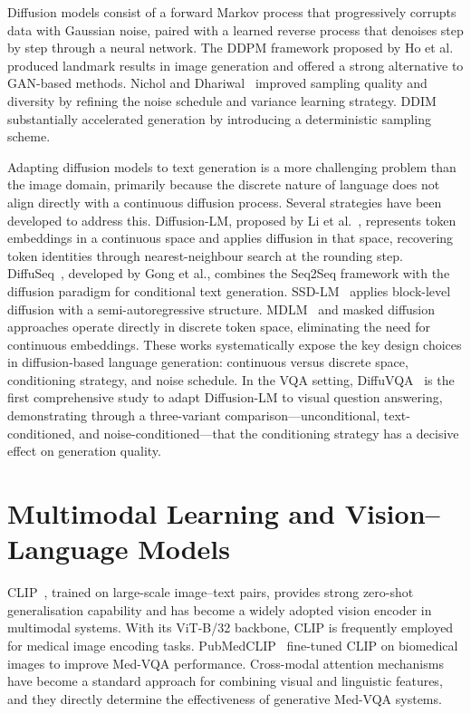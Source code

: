 \documentclass[9pt]{report}
\begin{document}
Diffusion models consist of a forward Markov process that progressively corrupts data with Gaussian noise, paired with a learned reverse process that denoises step by step through a neural network. The DDPM framework proposed by Ho et al.~\cite{ddpm} produced landmark results in image generation and offered a strong alternative to GAN-based methods. Nichol and Dhariwal~\cite{improved_ddpm} improved sampling quality and diversity by refining the noise schedule and variance learning strategy. DDIM~\cite{ddim} substantially accelerated generation by introducing a deterministic sampling scheme.

Adapting diffusion models to text generation is a more challenging problem than the image domain, primarily because the discrete nature of language does not align directly with a continuous diffusion process. Several strategies have been developed to address this. Diffusion-LM, proposed by Li et al.~\cite{diffusionlm}, represents token embeddings in a continuous space and applies diffusion in that space, recovering token identities through nearest-neighbour search at the rounding step. DiffuSeq~\cite{diffuseq}, developed by Gong et al., combines the Seq2Seq framework with the diffusion paradigm for conditional text generation. SSD-LM~\cite{ssdlm} applies block-level diffusion with a semi-autoregressive structure. MDLM~\cite{mdlm} and masked diffusion approaches operate directly in discrete token space, eliminating the need for continuous embeddings. These works systematically expose the key design choices in diffusion-based language generation: continuous versus discrete space, conditioning strategy, and noise schedule. In the VQA setting, DiffuVQA~\cite{diffuvqa} is the first comprehensive study to adapt Diffusion-LM to visual question answering, demonstrating through a three-variant comparison---unconditional, text-conditioned, and noise-conditioned---that the conditioning strategy has a decisive effect on generation quality.

\section{Multimodal Learning and Vision--Language Models}

CLIP~\cite{clip}, trained on large-scale image--text pairs, provides strong zero-shot generalisation capability and has become a widely adopted vision encoder in multimodal systems. With its ViT-B/32 backbone, CLIP is frequently employed for medical image encoding tasks. PubMedCLIP~\cite{pubmedclip} fine-tuned CLIP on biomedical images to improve Med-VQA performance. Cross-modal attention mechanisms have become a standard approach for combining visual and linguistic features, and they directly determine the effectiveness of generative Med-VQA systems.
\end{document}
